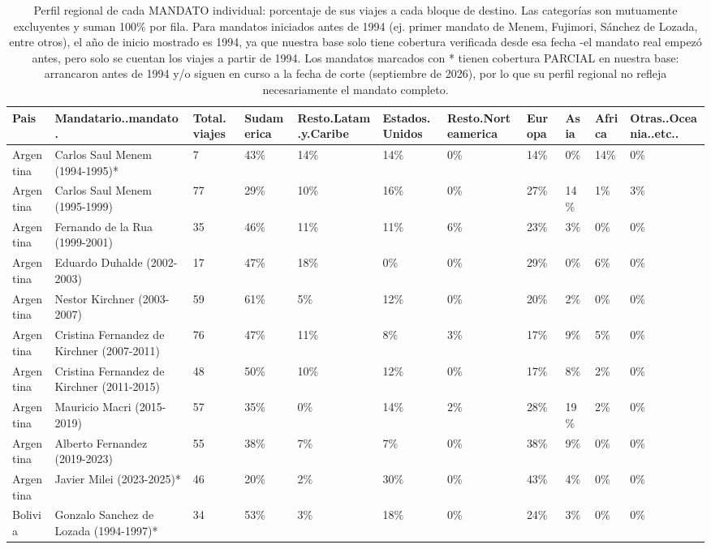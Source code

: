 \documentclass[11pt,a4paper]{article}
\begin{document}
\begin{longtable}{lllllllllll}
\caption{Perfil regional de cada MANDATO individual: porcentaje de sus viajes a cada bloque de destino. Las categor\'ias son mutuamente excluyentes y suman 100\% por fila. Para mandatos iniciados antes de 1994 (ej. primer mandato de Menem, Fujimori, S\'anchez de Lozada, entre otros), el a\~no de inicio mostrado es 1994, ya que nuestra base solo tiene cobertura verificada desde esa fecha -el mandato real empez\'o antes, pero solo se cuentan los viajes a partir de 1994. Los mandatos marcados con * tienen cobertura PARCIAL en nuestra base: arrancaron antes de 1994 y/o siguen en curso a la fecha de corte (septiembre de 2026), por lo que su perfil regional no refleja necesariamente el mandato completo.} \\ 
  \hline
Pais & Mandatario..mandato. & Total.viajes & Sudamerica & Resto.Latam.y.Caribe & Estados.Unidos & Resto.Norteamerica & Europa & Asia & Africa & Otras..Oceania..etc.. \\ 
  \hline
Argentina & Carlos Saul Menem (1994-1995)* & 7 & 43\% & 14\% & 14\% & 0\% & 14\% & 0\% & 14\% & 0\% \\ 
  Argentina & Carlos Saul Menem (1995-1999) & 77 & 29\% & 10\% & 16\% & 0\% & 27\% & 14\% & 1\% & 3\% \\ 
  Argentina & Fernando de la Rua (1999-2001) & 35 & 46\% & 11\% & 11\% & 6\% & 23\% & 3\% & 0\% & 0\% \\ 
  Argentina & Eduardo Duhalde (2002-2003) & 17 & 47\% & 18\% & 0\% & 0\% & 29\% & 0\% & 6\% & 0\% \\ 
  Argentina & Nestor Kirchner (2003-2007) & 59 & 61\% & 5\% & 12\% & 0\% & 20\% & 2\% & 0\% & 0\% \\ 
  Argentina & Cristina Fernandez de Kirchner (2007-2011) & 76 & 47\% & 11\% & 8\% & 3\% & 17\% & 9\% & 5\% & 0\% \\ 
  Argentina & Cristina Fernandez de Kirchner (2011-2015) & 48 & 50\% & 10\% & 12\% & 0\% & 17\% & 8\% & 2\% & 0\% \\ 
  Argentina & Mauricio Macri (2015-2019) & 57 & 35\% & 0\% & 14\% & 2\% & 28\% & 19\% & 2\% & 0\% \\ 
  Argentina & Alberto Fernandez (2019-2023) & 55 & 38\% & 7\% & 7\% & 0\% & 38\% & 9\% & 0\% & 0\% \\ 
  Argentina & Javier Milei (2023-2025)* & 46 & 20\% & 2\% & 30\% & 0\% & 43\% & 4\% & 0\% & 0\% \\ 
  Bolivia & Gonzalo Sanchez de Lozada (1994-1997)* & 34 & 53\% & 3\% & 18\% & 0\% & 24\% & 3\% & 0\% & 0\% \\ 

\end{longtable}
\end{document}
